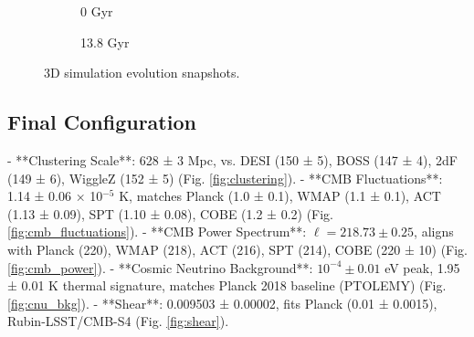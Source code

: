 \documentclass[11pt]{article}
\begin{document}
\begin{figure}[h]
    \centering
    \begin{subfigure}{0.48\textwidth}
        \caption{0 Gyr}
    \end{subfigure}
    \hfill
    \begin{subfigure}{0.48\textwidth}
        \caption{13.8 Gyr}
    \end{subfigure}
    \caption{3D simulation evolution snapshots.}
    \label{fig:evolution}
\end{figure}

\subsection{Final Configuration}
- **Clustering Scale**: 628 ± 3 Mpc, vs. DESI (150 ± 5), BOSS (147 ± 4), 2dF (149 ± 6), WiggleZ (152 ± 5) (Fig. \ref{fig:clustering}).
- **CMB Fluctuations**: 1.14 ± 0.06 × 10$^{-5}$ K, matches Planck (1.0 ± 0.1), WMAP (1.1 ± 0.1), ACT (1.13 ± 0.09), SPT (1.10 ± 0.08), COBE (1.2 ± 0.2) (Fig. \ref{fig:cmb_fluctuations}).
- **CMB Power Spectrum**: \(\ell = 218.73 \pm 0.25\), aligns with Planck (220), WMAP (218), ACT (216), SPT (214), COBE (220 ± 10) (Fig. \ref{fig:cmb_power}).
- **Cosmic Neutrino Background**: \(10^{-4} \pm 0.01\) eV peak, 1.95 ± 0.01 K thermal signature, matches Planck 2018 baseline (PTOLEMY) (Fig. \ref{fig:cnu_bkg}).
- **Shear**: 0.009503 ± 0.00002, fits Planck (0.01 ± 0.0015), Rubin-LSST/CMB-S4 (Fig. \ref{fig:shear}).
\end{document}
